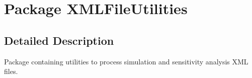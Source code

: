 \hypertarget{namespaceXMLFileUtilities}{}\section{Package X\+M\+L\+File\+Utilities}
\label{namespaceXMLFileUtilities}


\subsection{Detailed Description}
Package containing utilities to process simulation and sensitivity analysis X\+M\+L files. 